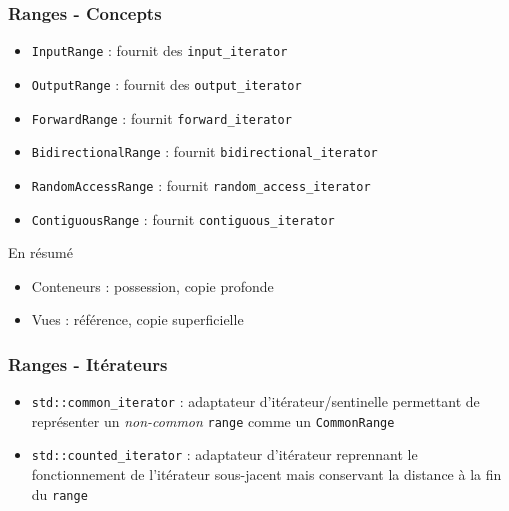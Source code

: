 \documentclass[C++.tex]{subfiles}
\begin{document}
\begin{frame}[fragile]
	\frametitle{Ranges - Concepts}
	\begin{itemize}
		\item \lstinline|InputRange| : fournit des \lstinline|input_iterator|
		\item \lstinline|OutputRange| : fournit des \lstinline|output_iterator|
		\item \lstinline|ForwardRange| : fournit \lstinline|forward_iterator|
		\item \lstinline|BidirectionalRange| : fournit \lstinline|bidirectional_iterator|
		\item \lstinline|RandomAccessRange| : fournit \lstinline|random_access_iterator|
		\item \lstinline|ContiguousRange| : fournit \lstinline|contiguous_iterator|
	\end{itemize}

	\pause

	\begin{block}{En résumé}
		\begin{itemize}
			\item Conteneurs : possession, copie profonde
			\item Vues : référence, copie superficielle
		\end{itemize}
	\end{block}
\end{frame}

\begin{frame}[fragile]
	\frametitle{Ranges - Itérateurs}
	\begin{itemize}
		\item \lstinline|std::common_iterator| : adaptateur d'itérateur/sentinelle permettant de représenter un \textit{non-common} \lstinline|range| comme un \lstinline|CommonRange|


		\item \lstinline|std::counted_iterator| : adaptateur d'itérateur reprennant le fonctionnement de l'itérateur sous-jacent mais conservant la distance à la fin du \lstinline|range|
	\end{itemize}
\end{frame}
\end{document}

